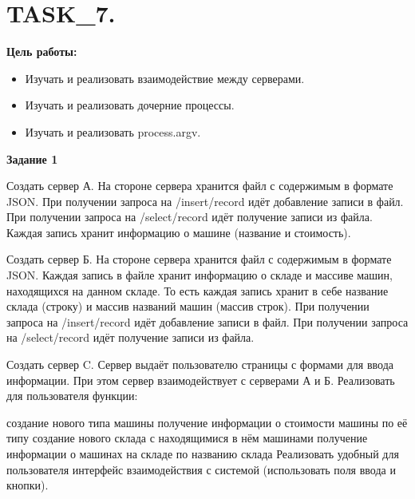 \chapter{TASK\_7.}

\textbf{Цель работы:}

\begin{itemize} 
	\item Изучать и реализовать взаимодействие между серверами.
	\item Изучать и реализовать дочерние процессы.
	\item Изучать и реализовать process.argv.
\end{itemize}

\textbf{Задание 1}

Создать сервер А. На стороне сервера хранится файл с содержимым в формате JSON. При получении запроса на /insert/record идёт добавление записи в файл. При получении запроса на /select/record идёт получение записи из файла. Каждая запись хранит информацию о машине (название и стоимость).

Создать сервер Б. На стороне сервера хранится файл с содержимым в формате JSON. Каждая запись в файле хранит информацию о складе и массиве машин, находящихся на данном складе. То есть каждая запись хранит в себе название склада (строку) и массив названий машин (массив строк). При получении запроса на /insert/record идёт добавление записи в файл. При получении запроса на /select/record идёт получение записи из файла.

Создать сервер C. Сервер выдаёт пользователю страницы с формами для ввода информации. При этом сервер взаимодействует с серверами А и Б. Реализовать для пользователя функции:

создание нового типа машины
получение информации о стоимости машины по её типу
создание нового склада с находящимися в нём машинами
получение информации о машинах на складе по названию склада
Реализовать удобный для пользователя интерфейс взаимодействия с системой (использовать поля ввода и кнопки).


